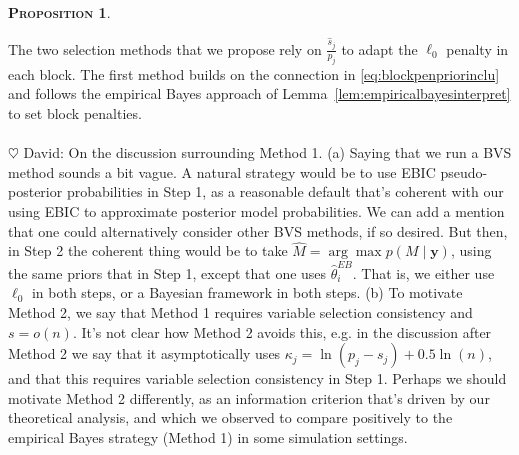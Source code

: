 \documentclass[aos]{imsart}
\theoremstyle{plain}
\newtheorem{prop}{\textsc{Proposition}}[section]
\newcommand{\david}[1]{{\small{\color{blue} \sf $\heartsuit$ David: #1}}}
\newcommand{\paul}[1]{{\small{\color{green} \sf $\spadesuit$ Paul: #1}}}
\newcommand{\bs}{\boldsymbol}
\begin{document}
\begin{prop}
    
\end{prop}

The two selection methods that we propose rely on %
$\frac{\widehat{s}_j}{p_j}$ to adapt the $\ell_0$ penalty in each block. 
The first method builds on the connection in \eqref{eq:blockpenpriorinclu} and follows the empirical Bayes approach of Lemma~\ref{lem:empiricalbayesinterpret} to set block penalties.\\ \\
\david{On the discussion surrounding Method 1. (a) Saying that we run a BVS method sounds a bit vague. A natural strategy would be to use EBIC pseudo-posterior probabilities in Step 1, as a reasonable default that's coherent with our using EBIC to approximate posterior model probabilities. We can add a mention that one could alternatively consider other BVS methods, if so desired. But then, in Step 2 the coherent thing would be to take $\hat{M}= \arg\max p(M \mid \bs y)$, using the same priors that in Step 1, except that one uses $\hat{\theta}_i^{EB}$. That is, we either use $\ell_0$ in both steps, or a Bayesian framework in both steps. (b) To motivate Method 2, we say that Method 1 requires variable selection consistency and $s=o(n)$. It's not clear how Method 2 avoids this, e.g. in the discussion after Method 2 we say that it asymptotically uses $\kappa_j= \ln(p_j - s_j) + 0.5 \ln(n)$, and that this requires variable selection consistency in Step 1. Perhaps we should motivate Method 2 differently, as an information criterion that's driven by our theoretical analysis, and which we observed to compare positively to the empirical Bayes strategy (Method 1) in some simulation settings.}\\ \\
\end{document}
